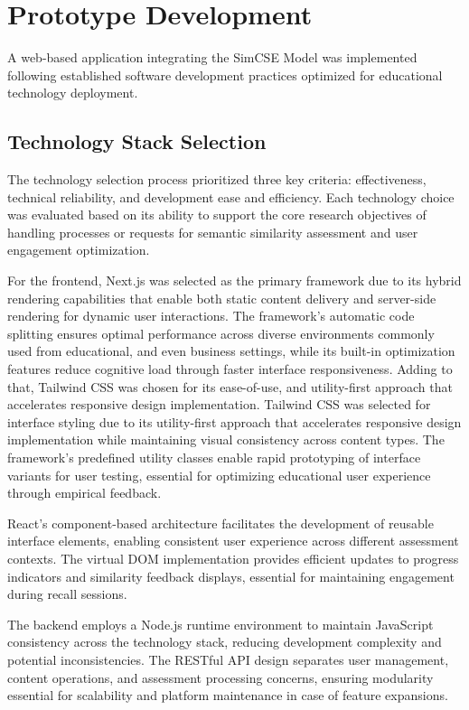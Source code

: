 {\color{maroon}
\section{Prototype Development}
\label{sec:prototype_development}

A web-based application integrating the SimCSE Model was implemented following established software development practices optimized for educational technology deployment.

{\color{maroon}
\subsection{Technology Stack Selection}

The technology selection process prioritized three key criteria: effectiveness, technical reliability, and development ease and efficiency. Each technology choice was evaluated based on its ability to support the core research objectives of handling processes or requests for semantic similarity assessment and user engagement optimization.

For the frontend, Next.js was selected as the primary framework due to its hybrid rendering capabilities that enable both static content delivery and server-side rendering for dynamic user interactions. The framework's automatic code splitting ensures optimal performance across diverse environments commonly used from educational, and even business settings, while its built-in optimization features reduce cognitive load through faster interface responsiveness. Adding to that, Tailwind CSS was chosen for its ease-of-use, and utility-first approach that accelerates responsive design implementation. Tailwind CSS was selected for interface styling due to its utility-first approach that accelerates responsive design implementation while maintaining visual consistency across content types. The framework's predefined utility classes enable rapid prototyping of interface variants for user testing, essential for optimizing educational user experience through empirical feedback.


React's component-based architecture facilitates the development of reusable  interface elements, enabling consistent user experience across different assessment contexts. The virtual DOM implementation provides efficient updates to progress indicators and similarity feedback displays, essential for maintaining engagement during recall sessions.

The backend employs a Node.js runtime environment to maintain JavaScript consistency across the technology stack, reducing development complexity and potential inconsistencies. The RESTful API design separates user management, content operations, and assessment processing concerns, ensuring modularity essential for scalability and platform maintenance in case of feature expansions. 

}}
